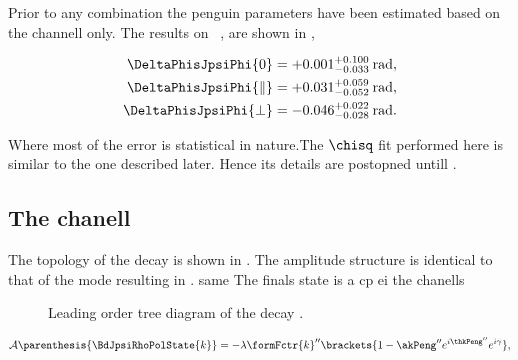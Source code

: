 
Prior to any combination the penguin parameters have been estimated based on the \BsJpsiKst channell only.
The results on ~\cite{bsjpsikst-paper}, are shown in ,

\begin{subequations}
  \label{delta_phis_jpsikst}
  \begin{align}
    \DeltaPhisJpsiPhi{0}         & = +0.001^{+0.100}_{-0.033} \:\text{rad},\\
    \DeltaPhisJpsiPhi{\parallel} & = +0.031^{+0.059}_{-0.052} \:\text{rad},\\
    \DeltaPhisJpsiPhi{\perp}     & = -0.046^{+0.022}_{-0.028} \:\text{rad}.
  \end{align}
\end{subequations}

\noindent Where most of the error is statistical in nature.The $\chisq$ fit performed here is similar
to the one described later. Hence its details are postopned untill .


\subsection{The \BdJpsiRho chanell}
\label{bsjpsirho_chanell}

The topology of the \BdJpsiRho decay is shown in . The amplitude structure is identical
to that of the \BsJpsiKst mode resulting in . same The finals state is a cp ei the chanells

\begin{figure}[h]
  \centering
  {\sffamily }
  \caption{Leading order tree diagram of the decay \BdJpsiRho.}
  \label{bs2jpsirho_diagram}
\end{figure}

\begin{equation}
  \mathcal{A} \parenthesis{\BdJpsiRhoPolState{k}} = -\lambda \formFctr{k}'' \brackets{ 1 - \akPeng'' e^{i\thkPeng''} e^{i\gamma} },
  \label{bsjpsirho_amp}
\end{equation}

